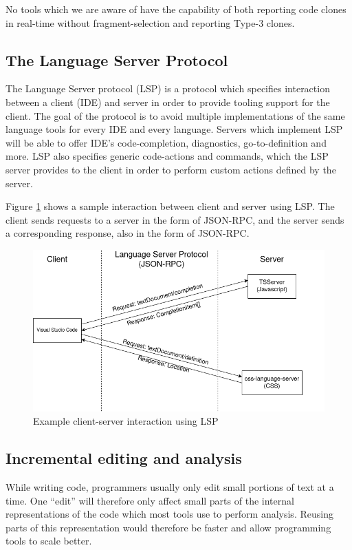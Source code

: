 \documentclass[12pt]{article}
\begin{document}
No tools which we are aware of have the capability of both reporting code clones in
real-time without fragment-selection and reporting Type-3 clones.

\subsection{The Language Server Protocol}

The Language Server protocol (LSP) is a protocol which specifies interaction between a
client (IDE) and server in order to provide tooling support for the client. The goal of
the protocol is to avoid multiple implementations of the same language tools for every
IDE and every language. Servers which implement LSP will be able to offer IDE's
code-completion, diagnostics, go-to-definition and more. LSP also specifies generic
code-actions and commands, which the LSP server provides to the client in order to perform
custom actions defined by the server.

Figure \ref{fig:lspcommunication} shows a sample interaction between client and server
using LSP. The client sends requests to a server in the form of JSON-RPC, and the server
sends a corresponding response, also in the form of JSON-RPC.

\begin{figure}
	\includegraphics[width=\textwidth]{images/lspcommunication.png}
	\caption{Example client-server interaction using LSP}
	\label{fig:lspcommunication}
\end{figure}

\subsection{Incremental editing and analysis}

While writing code, programmers usually only edit small portions of text at a time. One
``edit'' will therefore only affect small parts of the internal representations of the
code which most tools use to perform analysis. Reusing parts of this representation would
therefore be faster and allow programming tools to scale better.
\end{document}
